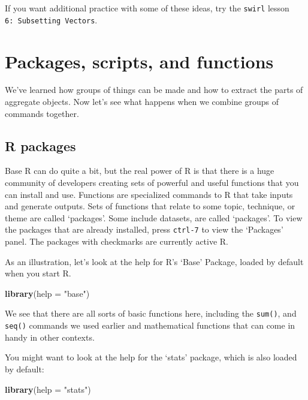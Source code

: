 \documentclass[]{article}
\newenvironment{Shaded}{\begin{snugshade}}{\end{snugshade}}
\newcommand{\KeywordTok}[1]{\textcolor[rgb]{0.13,0.29,0.53}{\textbf{#1}}}
\newcommand{\DataTypeTok}[1]{\textcolor[rgb]{0.13,0.29,0.53}{#1}}
\newcommand{\StringTok}[1]{\textcolor[rgb]{0.31,0.60,0.02}{#1}}
\newcommand{\NormalTok}[1]{#1}
\begin{document}
If you want additional practice with some of these ideas, try the
\texttt{swirl} lesson \texttt{6:\ Subsetting\ Vectors}.

\section{Packages, scripts, and
functions}\label{packages-scripts-and-functions}

We've learned how groups of things can be made and how to extract the
parts of aggregate objects. Now let's see what happens when we combine
groups of commands together.

\subsection{R packages}\label{r-packages}

Base R can do quite a bit, but the real power of R is that there is a
huge community of developers creating sets of powerful and useful
functions that you can install and use. Functions are specialized
commands to R that take inputs and generate outputs. Sets of functions
that relate to some topic, technique, or theme are called `packages'.
Some include datasets, are called `packages'. To view the packages that
are already installed, press \texttt{ctrl-7} to view the `Packages'
panel. The packages with checkmarks are currently active R.

As an illustration, let's look at the help for R's `Base' Package,
loaded by default when you start R.

\begin{Shaded}
\begin{Highlighting}[]
\KeywordTok{library}\NormalTok{(}\DataTypeTok{help =} \StringTok{"base"}\NormalTok{)}
\end{Highlighting}
\end{Shaded}

We see that there are all sorts of basic functions here, including the
\texttt{sum()}, and \texttt{seq()} commands we used earlier and
mathematical functions that can come in handy in other contexts.

You might want to look at the help for the `stats' package, which is
also loaded by default:

\begin{Shaded}
\begin{Highlighting}[]
\KeywordTok{library}\NormalTok{(}\DataTypeTok{help =} \StringTok{"stats"}\NormalTok{)}
\end{Highlighting}
\end{Shaded}
\end{document}
